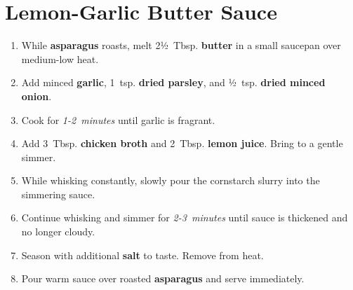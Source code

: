 \documentclass[11pt,letterpaper]{article}
\begin{document}
\section*{Lemon-Garlic Butter Sauce}

\begin{enumerate}
    \item While \textbf{asparagus} roasts, melt 2½~Tbsp. \textbf{butter} in a small saucepan over medium-low heat.
    \item Add minced \textbf{garlic}, 1~tsp. \textbf{dried parsley}, and ½~tsp. \textbf{dried minced onion}.
    \item Cook for \textit{1-2~minutes} until garlic is fragrant.
    \item Add 3~Tbsp. \textbf{chicken broth} and 2~Tbsp. \textbf{lemon juice}. Bring to a gentle simmer.
    \item While whisking constantly, slowly pour the cornstarch slurry into the simmering sauce.
    \item Continue whisking and simmer for \textit{2-3~minutes} until sauce is thickened and no longer cloudy.
    \item Season with additional \textbf{salt} to taste. Remove from heat.
    \item Pour warm sauce over roasted \textbf{asparagus} and serve immediately.
\end{enumerate}
\end{document}
